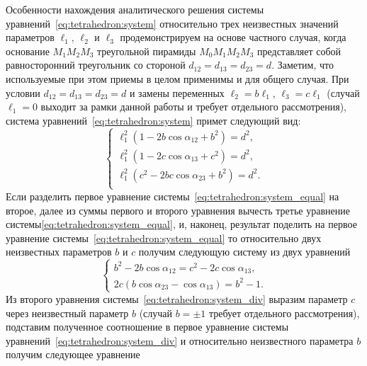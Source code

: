 \documentclass[../main.tex]{subfiles}
\begin{document}
Особенности нахождения аналитического решения системы уравнений~\eqref{eq:tetrahedron:system} относительно трех неизвестных значений параметров $\ell_1$, $\ell_2$ и $\ell_3$ продемонстрируем на основе частного случая, когда основание $M_1 M_2 M_3$ треугольной пирамиды $M_0 M_1 M_2 M_3$ представляет собой равносторонний треугольник со стороной $d_{12} = d_{13} = d_{23} = d$. Заметим, что используемые при этом приемы в целом применимы и для общего случая. При условии $d_{12} = d_{13} = d_{23} = d$ и замены переменных $\ell_2 = b \ell_1$, $\ell_3 = c \ell_1$ (случай $\ell_1 = 0$ выходит за рамки данной работы и требует отдельного рассмотрения), система уравнений~\eqref{eq:tetrahedron:system} примет следующий вид:
\begin{equation}\label{eq:tetrahedron:system_equal}
  \begin{cases}
    \ell_1^2 \left(1 - 2b\cos\alpha_{12} + b^2\right) = d^2, \\
    \ell_1^2 \left(1 - 2c\cos\alpha_{13} + c^2\right) = d^2, \\
    \ell_1^2 \left(c^2 - 2bc\cos\alpha_{23} + b^2\right) = d^2. \\
  \end{cases}
\end{equation}
Если разделить первое уравнение системы~\eqref{eq:tetrahedron:system_equal} на второе, далее из суммы первого и второго уравнения вычесть третье уравнение системы\eqref{eq:tetrahedron:system_equal}, и, наконец, результат поделить на первое уравнение системы~\eqref{eq:tetrahedron:system_equal} то относительно двух неизвестных параметров $b$ и $c$ получим следующую систему из двух уравнений
\begin{equation}\label{eq:tetrahedron:system_div}
  \begin{cases}
    b^2- 2b\cos\alpha_{12} = c^2 - 2c\cos\alpha_{13}, \\
    2c \left(b\cos\alpha_{23} - \cos\alpha_{13}\right) = b^2 - 1.
  \end{cases}
\end{equation}
Из второго уравнения системы~\eqref{eq:tetrahedron:system_div} выразим параметр $c$ через неизвестный параметр $b$ (случай $b = \pm 1$ требует отдельного рассмотрения), подставим полученное соотношение в первое уравнение системы уравнений~\eqref{eq:tetrahedron:system_div} и относительно неизвестного параметра $b$ получим следующее уравнение
\end{document}
